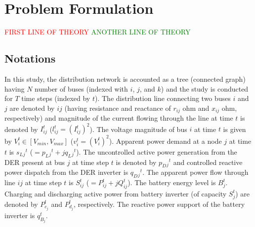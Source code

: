\documentclass{article}
\begin{document}
\section{Problem Formulation}
\textcolor{red}{FIRST LINE OF THEORY}
\textcolor{green}{ANOTHER LINE OF THEORY}

\subsection{Notations}
In this study, the distribution network is accounted as a tree (connected graph) having \(N\) number of buses (indexed with \(i\), \(j\), and \(k\)) and the study is conducted for \(T\) time steps (indexed by \(t\)). The distribution line connecting two buses \(i\) and \(j\) are denoted by {\(ij\)} (having resistance and reactance of \(r_{ij}\) ohm and \(x_{ij}\) ohm, respectively) and magnitude of the current flowing through the line at time \(t\) is denoted by \(I_{ij}^t\) (\(l_{ij}^t=\left(I_{ij}^t\right)^2\)). The voltage magnitude of bus \(i\) at time \(t\) is given by \(V_i^t \in [V_{min},V_{max}]\) (\(v_i^t=\left(V_i^t\right)^2\)). Apparent power demand at a node \(j\) at time \(t\) is \(s_L{_j}^t\) (\(=p_L{_j}^t+\textit{j}q_L{_j}^t\)). The uncontrolled active power generation from the DER present at bus \(j\) at time step \(t\) is denoted by \(p_D{_j}^t\) and controlled reactive power dispatch from the DER inverter is \(q_D{_j}^t\). The apparent power flow through line {\(ij\)} at time step \(t\) is \(S_{ij}^t\) (\(=P_{ij}^t+\textit{j}Q_{ij}^t\)). The battery energy level is \(B_j^t\). Charging and discharging active power from battery inverter (of capacity \(S_j^t\)) are denoted by \(P_{c_j}^t\) and \(P_{d_j}^t\), respectively. The reactive power support of the battery inverter is \(q_{B_j}^t\).
\end{document}
